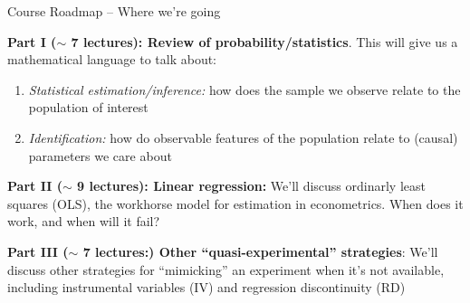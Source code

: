 \documentclass[11pt,english]{beamer}
\newenvironment{wideitemize}{\itemize\addtolength{\itemsep}{10pt}}{\enditemize}
\begin{document}
\begin{frame}{Course Roadmap -- Where we're going}
	\begin{wideitemize}
		\item
		\textbf{Part I ($\sim$ 7 lectures): Review of probability/statistics}. This will give us a mathematical language to talk about:
		
			\begin{enumerate}
				\item 
				\textit{Statistical estimation/inference: }how does the sample we observe relate to the population of interest
				
				\item
				\textit{Identification:} how do observable features of the population relate to (causal) parameters we care about
			\end{enumerate}
		\pause 
		
		\item
		\textbf{Part II ($\sim$ 9 lectures): Linear regression: } We'll discuss ordinarly least squares (OLS), the workhorse model for estimation in econometrics. When does it work, and when will it fail?
		
		\pause
		\item
		\textbf{Part III ($\sim$ 7 lectures:) Other ``quasi-experimental'' strategies}: We'll discuss other strategies for ``mimicking'' an experiment when it's not available, including instrumental variables (IV) and regression discontinuity (RD)
			 
	\end{wideitemize}
\end{frame}
\end{document}
